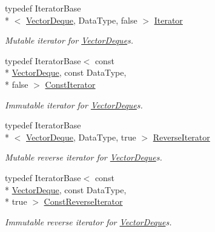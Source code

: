 \begin{DoxyCompactItemize}
\item 
\hypertarget{classVectorDeque_a14c9e8124611465c5aec6687b9c18a4b}{typedef Iterator\-Base\\*
$<$ \hyperlink{classVectorDeque}{Vector\-Deque}, Data\-Type, false $>$ \hyperlink{classVectorDeque_a14c9e8124611465c5aec6687b9c18a4b}{Iterator}}\label{classVectorDeque_a14c9e8124611465c5aec6687b9c18a4b}

\begin{DoxyCompactList}\small\item\em Mutable iterator for {\ttfamily \hyperlink{classVectorDeque}{Vector\-Deque}}s. \end{DoxyCompactList}\item 
\hypertarget{classVectorDeque_a5cfe4fc61668a1213c99e052450297e6}{typedef Iterator\-Base$<$ const \\*
\hyperlink{classVectorDeque}{Vector\-Deque}, const Data\-Type, \\*
false $>$ \hyperlink{classVectorDeque_a5cfe4fc61668a1213c99e052450297e6}{Const\-Iterator}}\label{classVectorDeque_a5cfe4fc61668a1213c99e052450297e6}

\begin{DoxyCompactList}\small\item\em Immutable iterator for {\ttfamily \hyperlink{classVectorDeque}{Vector\-Deque}}s. \end{DoxyCompactList}\item 
\hypertarget{classVectorDeque_a6c7645ed21181c82fd1837362a1e5145}{typedef Iterator\-Base\\*
$<$ \hyperlink{classVectorDeque}{Vector\-Deque}, Data\-Type, true $>$ \hyperlink{classVectorDeque_a6c7645ed21181c82fd1837362a1e5145}{Reverse\-Iterator}}\label{classVectorDeque_a6c7645ed21181c82fd1837362a1e5145}

\begin{DoxyCompactList}\small\item\em Mutable reverse iterator for {\ttfamily \hyperlink{classVectorDeque}{Vector\-Deque}}s. \end{DoxyCompactList}\item 
\hypertarget{classVectorDeque_a291aa5e53d483276367327acb93f3846}{typedef Iterator\-Base$<$ const \\*
\hyperlink{classVectorDeque}{Vector\-Deque}, const Data\-Type, \\*
true $>$ \hyperlink{classVectorDeque_a291aa5e53d483276367327acb93f3846}{Const\-Reverse\-Iterator}}\label{classVectorDeque_a291aa5e53d483276367327acb93f3846}

\begin{DoxyCompactList}\small\item\em Immutable reverse iterator for {\ttfamily \hyperlink{classVectorDeque}{Vector\-Deque}}s. \end{DoxyCompactList}\end{DoxyCompactItemize}
